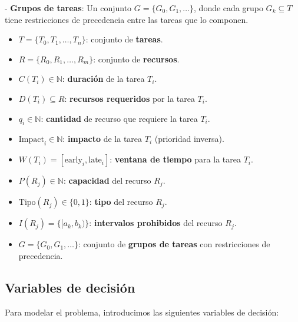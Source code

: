 \documentclass{article}
\begin{document}
- \textbf{Grupos de tareas}: Un conjunto \( G = \{G_0, G_1, \dots\} \), donde cada grupo \( G_k \subseteq T \) tiene restricciones de precedencia entre las tareas que lo componen.

\vspace{0.5cm}

\begin{tcolorbox}[colback=gray!5!white, colframe=gray!75!black, title={Parámetros del modelo}]
    \begin{itemize}
        \item \( T = \{T_0, T_1, \dots, T_n\} \): conjunto de \textbf{tareas}.
        \item \( R = \{R_0, R_1, \dots, R_m\} \): conjunto de \textbf{recursos}.
        \item \( C(T_i) \in \mathbb{N} \): \textbf{duración} de la tarea \( T_i \).
        \item \( D(T_i) \subseteq R \): \textbf{recursos requeridos} por la tarea \( T_i \).
        \item \( q_i \in \mathbb{N} \): \textbf{cantidad} de recurso que requiere la tarea \( T_i \).
        \item \( \text{Impact}_i \in \mathbb{N} \): \textbf{impacto} de la tarea \( T_i \) (prioridad inversa).
        \item \( W(T_i) = [\text{early}_i, \text{late}_i] \): \textbf{ventana de tiempo} para la tarea \( T_i \).
        \item \( P(R_j) \in \mathbb{N} \): \textbf{capacidad} del recurso \( R_j \).
        \item \( \text{Tipo}(R_j) \in \{0, 1\} \): \textbf{tipo} del recurso \( R_j \).
        \item \( I(R_j) = \{[a_k, b_k)\} \): \textbf{intervalos prohibidos} del recurso \( R_j \).
        \item \( G = \{G_0, G_1, \dots\} \): conjunto de \textbf{grupos de tareas} con restricciones de precedencia.
    \end{itemize}
\end{tcolorbox}

\vspace{0.5cm}

\subsection*{Variables de decisión}

Para modelar el problema, introducimos las siguientes variables de decisión:
\end{document}
